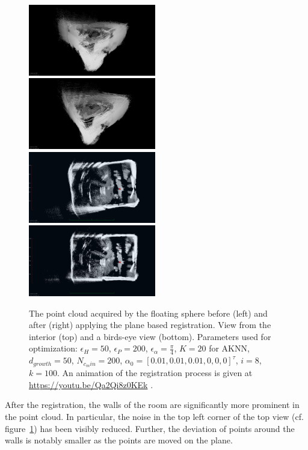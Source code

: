 \begin{figure}
	\centering
	\includegraphics[width=0.495\textwidth]{./images/cylon_uncorr_corner}\hfill
	\includegraphics[width=0.495\textwidth]{./images/cylon_corr_corner}\\
	\includegraphics[width=0.495\textwidth]{./images/cylon_uncorr_top}\hfill
	\includegraphics[width=0.495\textwidth]{./images/cylon_corr_top}
	\caption{The point cloud acquired by the floating sphere before (left) and after (right) applying the plane based registration. View from the interior (top) and a birds-eye view (bottom). Parameters used for optimization: $\epsilon_H = 50$, $\epsilon_P = 200$, $\epsilon_\alpha = \frac{\pi}{4}$, $K = 20$ for AKNN, $d_{growth} = 50$, $N_{c_min} = 200$, $\alpha_0 = [0.01, 0.01, 0.01, 0, 0, 0]^\tau$, $i = 8$, $k = 100$. An animation of the registration process is given at \url{https://youtu.be/Qa2Qi8z0KEk} .}
	\label{fig:cylon-corrected}
\end{figure}
After the registration, the walls of the room are significantly more prominent in the point cloud. 
In particular, the noise in the top left corner of the top view (cf. figure~\ref{fig:cylon-corrected}) has been visibly reduced.
Further, the deviation of points around the walls is notably smaller as the points are moved on the plane.

